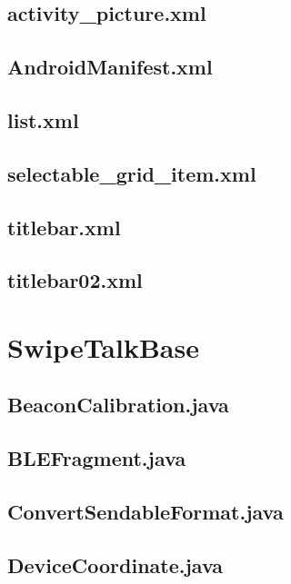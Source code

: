 \documentclass[11pt,a4j]{jarticle}
\begin{document}
\subsection{activity\_picture.xml}
	
	\newpage
\subsection{AndroidManifest.xml}
	
	\newpage
\subsection{list.xml}
	
	\newpage
\subsection{selectable\_grid\_item.xml}
	
	\newpage
\subsection{titlebar.xml}
	
	\newpage
\subsection{titlebar02.xml}
	
	\newpage



\section{SwipeTalkBase}
\subsection{BeaconCalibration.java}
	
	\newpage
\subsection{BLEFragment.java}
	
	\newpage
\subsection{ConvertSendableFormat.java}
	
	\newpage
\subsection{DeviceCoordinate.java}
	
	\newpage
\end{document}
